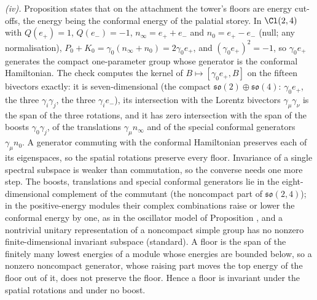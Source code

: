 \emph{(iv).} Proposition  states that on the attachment the tower's floors are energy cut-offs, the energy being the conformal energy of the palatial storey. In $\Cl(2,4)$ with $Q(e_+) = 1$, $Q(e_-) = -1$, $n_\infty = e_+ + e_-$ and $n_0 = e_+ - e_-$ (null; any normalisation), $P_0 + K_0 = \gamma_0(n_\infty + n_0) = 2\gamma_0e_+$, and $(\gamma_0e_+)^2 = -1$, so $\gamma_0e_+$ generates the compact one-parameter group whose generator is the conformal Hamiltonian. The check computes the kernel of $B \mapsto [\gamma_0e_+, B]$ on the fifteen bivectors exactly: it is seven-dimensional (the compact $\mathfrak{so}(2) \oplus \mathfrak{so}(4)$: $\gamma_0e_+$, the three $\gamma_i\gamma_j$, the three $\gamma_ie_-$), its intersection with the Lorentz bivectors $\gamma_\mu\gamma_\nu$ is the span of the three rotations, and it has zero intersection with the span of the boosts $\gamma_0\gamma_j$, of the translations $\gamma_\mu n_\infty$ and of the special conformal generators $\gamma_\mu n_0$. A generator commuting with the conformal Hamiltonian preserves each of its eigenspaces, so the spatial rotations preserve every floor. Invariance of a single spectral subspace is weaker than commutation, so the converse needs one more step. The boosts, translations and special conformal generators lie in the eight-dimensional complement of the commutant (the noncompact part of $\mathfrak{so}(2,4)$); in the positive-energy modules their complex combinations raise or lower the conformal energy by one, as in the oscillator model of Proposition , and a nontrivial unitary representation of a noncompact simple group has no nonzero finite-dimensional invariant subspace (standard). A floor is the span of the finitely many lowest energies of a module whose energies are bounded below, so a nonzero noncompact generator, whose raising part moves the top energy of the floor out of it, does not preserve the floor. Hence a floor is invariant under the spatial rotations and under no boost.

